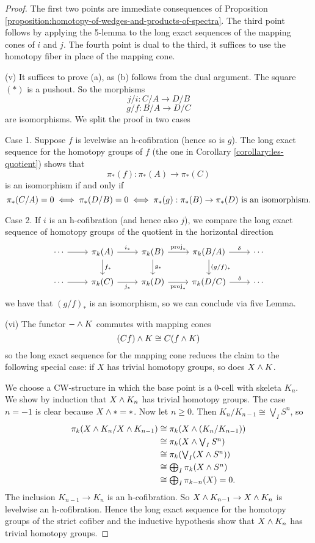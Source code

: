 \begin{proof}
The first two points are immediate consequences of Proposition \ref{proposition:homotopy-of-wedges-and-products-of-spectra}. The third point follows by applying the 5-lemma to the long exact sequences of the mapping cones of $i$ and $j$. The fourth point is dual to the third, it suffices to use the homotopy fiber in place of the mapping cone.

(v) It suffices to prove (a), as (b) follows from the dual argument. The square $(*)$ is a pushout. So the morphisms
\[j/i:C/A\to D/B\]
\[g/f:B/A\to D/C\]
are isomorphisms. We split the proof in two cases

Case 1. Suppose $f$ is levelwise an h-cofibration (hence so is $g$). The long exact sequence for the homotopy groups of $f$ (the one in Corollary \ref{corollary:les-quotient}) shows that
\[\pi_*(f):\pi_*(A)\to\pi_*(C)\]
is an isomorphism if and only if
\[\pi_*(C/A)=0\iff\pi_*(D/B)=0\iff\pi_*(g):\pi_*(B)\to\pi_*(D)\text{\upshape\ is an isomorphism.}\]

Case 2. If $i$ is an h-cofibration (and hence also $j$), we compare the long exact sequence of homotopy groups of the quotient in the horizontal direction
\[
\begin{tikzcd}
\cdots \arrow[r] & \pi_k(A) \arrow[d, "f_*"] \arrow[r, "i_*"] & \pi_k(B) \arrow[r, "\operatorname{proj}_*"] \arrow[d, "g_*"] & \pi_k(B/A) \arrow[r, "\delta"] \arrow[d, "(g/f)_*"] & \cdots\\
\cdots \arrow[r] & \pi_k(C) \arrow[r, "j_*", swap] & \pi_k(D) \arrow[r, "\operatorname{proj}_*", swap] & \pi_k(D/C) \arrow[r, "\delta"] & \cdots
\end{tikzcd}
\]
we have that $(g/f)_*$ is an isomorphism, so we can conclude via five Lemma.

(vi) The functor $-\wedge K$ commutes with mapping cones
\[(Cf)\wedge K\cong C(f\wedge K)\]
so the long exact sequence for the mapping cone reduces the claim to the following special case: if $X$ has trivial homotopy groups, so does $X\wedge K$.

We choose a CW-structure in which the base point is a $0$-cell with skeleta $K_n$. We show by induction that $X\wedge K_n$ has trivial homotopy groups. The case $n=-1$ is clear because $X\wedge*=*$. Now let $n\geq0$. Then $K_n/K_{n-1}\cong\bigvee_I S^n$, so
\begin{align*}
    \pi_k(X\wedge K_n/X\wedge K_{n-1})&\cong\pi_k(X\wedge(K_n/K_{n-1}))\\
    &\textstyle\cong\pi_k(X\wedge\bigvee_I S^n)\\
    &\textstyle\cong\pi_k(\bigvee_I(X\wedge S^n))\\
    &\textstyle\cong\bigoplus_I\pi_k(X\wedge S^n)\\
    &\textstyle\cong\bigoplus_I\pi_{k-n}(X)=0.
\end{align*}
The inclusion $K_{n-1}\to K_n$ is an h-cofibration. So $X\wedge K_{n-1}\to X\wedge K_n$ is levelwise an h-cofibration. Hence the long exact sequence for the homotopy groups of the strict cofiber and the inductive hypothesis show that $X\wedge K_n$ has trivial homotopy groups.


\end{proof}
